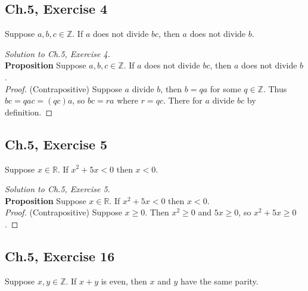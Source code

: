 \documentclass[12pt]{amsart}
\numberwithin{equation}{section}
\theoremstyle{definition}
\theoremstyle{remark}
\begin{document}


\subsection*{Ch.5,  Exercise 4}  Suppose $ a,b,c \in \mathbb{Z} $. If $ a $ does not divide $ bc $, then $ a $ does not divide $ b $.



\begin{proof}[Solution to Ch.5,  Exercise 4]
\ \\
\textbf{Proposition}  Suppose $ a,b,c \in \mathbb{Z} $. If $ a $ does not divide $ bc $, then $ a $ does not divide $ b $. \\
\textit{Proof.} (Contrapositive) Suppose $ a $ divide $ b $, then $ b = qa $ for some $ q \in \mathbb{Z} $. Thus $ bc = qac = (qc)a $, so $ bc = ra $ where $ r = qc $. There for $ a $ divide $ bc $ by definition.

\end{proof}





\subsection*{Ch.5,  Exercise 5}  Suppose $ x \in \mathbb{R} $. If $ x^2 + 5x < 0 $ then $ x < 0 $.



\begin{proof}[Solution to Ch.5,  Exercise 5]
\ \\
\textbf{Proposition}  Suppose $ x \in \mathbb{R} $. If $ x^2 + 5x < 0 $ then $ x < 0 $. \\
\textit{Proof.} (Contrapositive) Suppose $ x \geq 0 $. Then $ x^2 \geq 0 $ and $ 5x \geq 0 $, so $ x^2 + 5x \geq 0 $.

\end{proof}




\subsection*{Ch.5,  Exercise 16}  Suppose $ x,y \in \mathbb{Z} $. If $ x + y $ is even, then $ x $ and $ y $ have the same parity.
\end{document}
